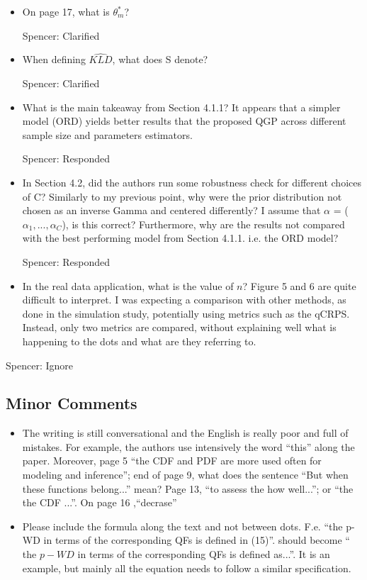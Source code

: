 \documentclass{article}
\newcommand{\spencer}[1]{{\color{blue} Spencer: #1}}
\begin{document}
\begin{itemize}
  \spencer{Ignore}

  \item On page 17, what is $\theta^*_m$?
  
  \spencer{Clarified}
  
  \item When defining $\widehat{KLD}$, what does S denote?
  
  \spencer{Clarified}

  \item What is the main takeaway from Section 4.1.1? It appears that a simpler model (ORD) yields
  better results that the proposed QGP across different sample size and parameters estimators.
  
  \spencer{Responded}
  
  \item In Section 4.2, did the authors run some robustness check for different choices of C? Similarly to
  my previous point, why were the prior distribution not chosen as an inverse Gamma and centered
  differently? I assume that $\alpha$ = ($\alpha_1, . . . , \alpha_C$), is this correct? Furthermore, why are the results not
  compared with the best performing model from Section 4.1.1. i.e. the ORD model?
  
  \spencer{Responded}
  
  \item In the real data application, what is the value of $n$? Figure 5 and 6 are quite difficult to interpret.
  I was expecting a comparison with other methods, as done in the simulation study, potentially
  using metrics such as the qCRPS. Instead, only two metrics are compared, without explaining
  well what is happening to the dots and what are they referring to.
  \end{itemize}
  
  \spencer{Ignore}


\subsection*{Minor Comments}

  \begin{itemize}
  \item The writing is still conversational and the English is really poor and full of mistakes. For example,
  the authors use intensively the word “this” along the paper. Moreover, page 5 “the CDF and
  PDF are more used often for modeling and inference”; end of page 9, what does the sentence
  “But when these functions belong...” mean? Page 13, “to assess the how well...”; or “the the
  CDF ...”. On page 16 ,“decrase”
  
  \item Please include the formula along the text and not between dots. F.e. “the p-WD in terms of the
  corresponding QFs is defined in (15)”. should become “ the $p-WD$ in terms of the corresponding
  QFs is defined as...”. It is an example, but mainly all the equation needs to follow a similar
  specification.

  \end{itemize}
  
\end{document}
